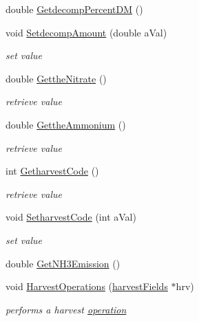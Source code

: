 \begin{DoxyCompactItemize}
double \hyperlink{classpatch_interface_class_ab314c250c27ab656c14cba03ec23a642}{GetdecompPercentDM} ()
\item 
void \hyperlink{classpatch_interface_class_aa9d2da459f2fc40f4a9cae8dbe41cba6}{SetdecompAmount} (double aVal)
\begin{DoxyCompactList}\small\item\em set value \item\end{DoxyCompactList}\item 
double \hyperlink{classpatch_interface_class_a90d39b2fb7130f2631285a362fffe5b4}{GettheNitrate} ()
\begin{DoxyCompactList}\small\item\em retrieve value \item\end{DoxyCompactList}\item 
double \hyperlink{classpatch_interface_class_a322c770b108657a636cc2e06b73963e9}{GettheAmmonium} ()
\begin{DoxyCompactList}\small\item\em retrieve value \item\end{DoxyCompactList}\item 
int \hyperlink{classpatch_interface_class_afced3ff48390bad8f8867247f36b6d0d}{GetharvestCode} ()
\begin{DoxyCompactList}\small\item\em retrieve value \item\end{DoxyCompactList}\item 
void \hyperlink{classpatch_interface_class_a789ced4ff646d1424b7771a51d86d69f}{SetharvestCode} (int aVal)
\begin{DoxyCompactList}\small\item\em set value \item\end{DoxyCompactList}\item 
double \hyperlink{classpatch_interface_class_a7c3316485cc5ee1ec04c3e5f89c6792c}{GetNH3Emission} ()
\item 
void \hyperlink{classpatch_interface_class_ae1a9d662c855a6ffd6988c5274af35f0}{HarvestOperations} (\hyperlink{classharvest_fields}{harvestFields} $\ast$hrv)
\begin{DoxyCompactList}\small\item\em performs a harvest \hyperlink{classoperation}{operation} \item\end{DoxyCompactList}\item 

\end{DoxyCompactItemize}
